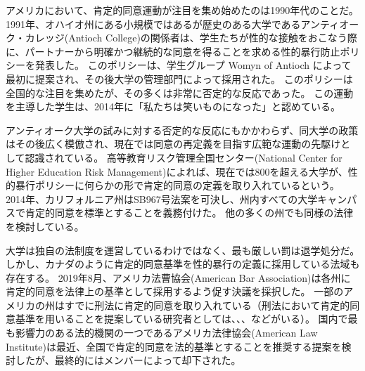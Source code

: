 \documentclass[paper=a4,book,openany]{jlreq}
\begin{document}
アメリカにおいて、肯定的同意運動が注目を集め始めたのは1990年代のことだ。
1991年、オハイオ州にある小規模ではあるが歴史のある大学であるアンティオーク・カレッジ(Antioch College)の関係者は、学生たちが性的な接触をおこなう際に、パートナーから明確かつ継続的な同意を得ることを求める性的暴行防止ポリシーを発表した。
このポリシーは、学生グループ Womyn of Antioch によって最初に提案され、その後大学の管理部門によって採用された。
このポリシーは全国的な注目を集めたが、その多くは非常に否定的な反応であった。
この運動を主導した学生は、2014年に「私たちは笑いものになった」と認めている\citep{saltman14:_we_start_crusad_affir_consen}。

アンティオーク大学の試みに対する否定的な反応にもかかわらず、同大学の政策はその後広く模倣され、現在では同意の再定義を目指す広範な運動の先駆けとして認識されている。
高等教育リスク管理全国センター(National Center for Higher Education Risk Management)によれば、現在では800を超える大学が、性的暴行ポリシーに何らかの形で肯定的同意の定義を取り入れているという。
2014年、カリフォルニア州はSB967号法案を可決し、州内すべての大学キャンパスで肯定的同意を標準とすることを義務付けた。
他の多くの州でも同様の法律を検討している\citep{new14:_yes_means_yes_world}。

大学は独自の法制度を運営しているわけではなく、最も厳しい罰は退学処分だ。
しかし、カナダのように肯定的同意基準を性的暴行の定義に採用している法域も存在する。
2019年8月、アメリカ法曹協会(American Bar Association)は各州に肯定的同意を法律上の基準として採用するよう促す決議を採択した\citep[p.1]{domestic19:_repor_house_deleg}。
一部のアメリカの州はすでに刑法に肯定的同意を取り入れている（刑法において肯定的同意基準を用いることを提案している研究者としては、\citet{schulhofer98:_unwan_sex}、\citet{anderson05:_negot_sex}、\citet{decker11:_no_still_means_yes}などがいる）。
国内で最も影響力のある法的機関の一つであるアメリカ法律協会(American Law Institute)は最近、全国で肯定的同意を法的基準とすることを推奨する提案を検討したが、最終的にはメンバーによって却下された。
\end{document}
